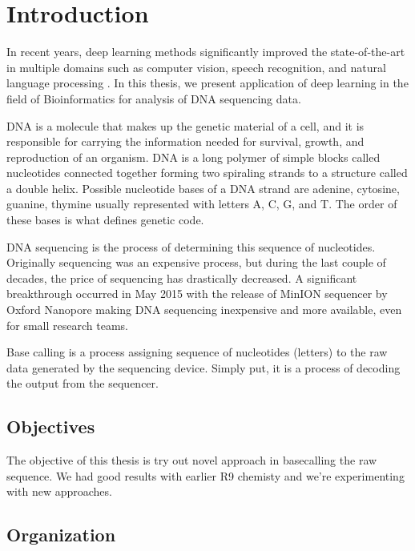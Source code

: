
\chapter{Introduction}
\label{chap:Introduction}

In recent years,  deep learning methods significantly improved the state-of-the-art in multiple domains such as computer vision, speech recognition, and natural language processing \cite{LeCun:1998:CNI:303568.303704}\cite{NIPS2012_4824}. 
In this thesis, we present application of deep learning in the field of  Bioinformatics for analysis of DNA sequencing data. 

DNA is a molecule that makes up the genetic material of a cell, and it is responsible for carrying the information needed for survival, growth, and reproduction of an organism. 
DNA is a long polymer of simple blocks called nucleotides connected together forming two spiraling strands to a structure called a double helix.  Possible nucleotide bases of a DNA strand are adenine, cytosine, guanine, thymine usually represented with letters A, C, G, and T. The order of these bases is what defines genetic code.

DNA sequencing is the process of determining this sequence of nucleotides. Originally sequencing was an expensive process, but during the last couple of decades, the price of sequencing has drastically decreased.  A significant breakthrough occurred in May 2015 with the release of MinION sequencer by Oxford Nanopore making DNA sequencing inexpensive and more available, even for small research teams. 

Base calling is a process assigning sequence of nucleotides (letters) to the raw data generated by the sequencing device. Simply put, it is a process of decoding the output from the sequencer.

\section{Objectives}

The objective of this thesis is try out novel approach in basecalling the raw sequence. We had good results with earlier R9 chemisty \citep{miculinic2017mincall} and we're experimenting with new approaches.

\section{Organization}